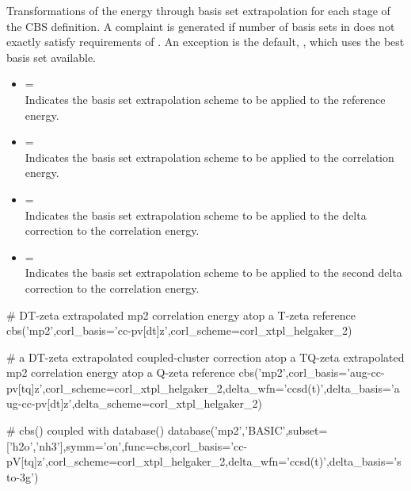 \begin{itemize}
Transformations of the energy through basis set extrapolation for each stage of the CBS definition. 
A complaint is generated if number of basis sets in  does not exactly satisfy 
requirements of . 
An exception is the default, , which uses the best basis set available.
\begin{itemize}
\item[]  = \textit{} \textbar\;  \\
Indicates the basis set extrapolation scheme to be applied to the reference energy.
\item[]  = \textit{} \textbar\;  \\
Indicates the basis set extrapolation scheme to be applied to the correlation energy.
\item[]  = \textit{} \textbar\;  \\
Indicates the basis set extrapolation scheme to be applied to the delta correction to the correlation energy.
\item[]  = \textit{} \textbar\;  \\
Indicates the basis set extrapolation scheme to be applied to the second delta correction to the correlation energy.
\end{itemize}
\end{itemize}


\begin{Snippet}
# DT-zeta extrapolated mp2 correlation energy atop a T-zeta reference 
cbs('mp2',corl_basis='cc-pv[dt]z',corl_scheme=corl_xtpl_helgaker_2) 

# a DT-zeta extrapolated coupled-cluster correction atop a TQ-zeta extrapolated mp2 correlation energy atop a Q-zeta reference 
cbs('mp2',corl_basis='aug-cc-pv[tq]z',corl_scheme=corl_xtpl_helgaker_2,delta_wfn='ccsd(t)',delta_basis='aug-cc-pv[dt]z',delta_scheme=corl_xtpl_helgaker_2)

# cbs() coupled with database() 
database('mp2','BASIC',subset=['h2o','nh3'],symm='on',func=cbs,corl_basis='cc-pV[tq]z',corl_scheme=corl_xtpl_helgaker_2,delta_wfn='ccsd(t)',delta_basis='sto-3g')

\end{Snippet}

